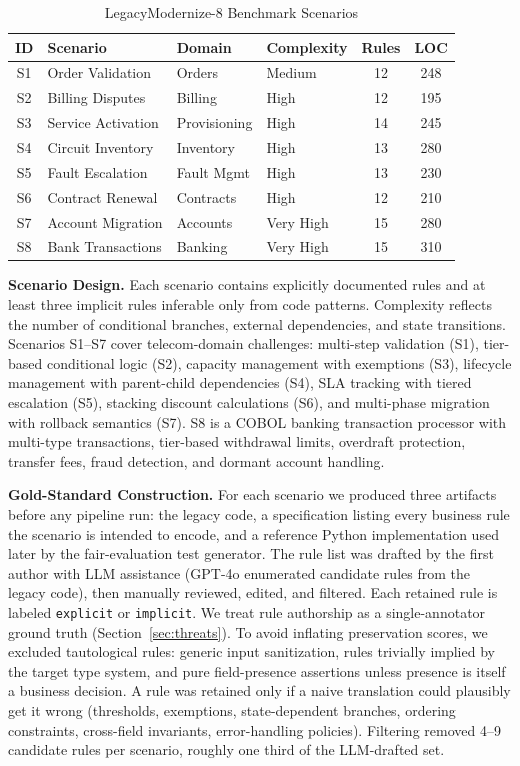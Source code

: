 \documentclass[conference]{IEEEtran}
\begin{document}
\begin{table}[htbp]
\caption{LegacyModernize-8 Benchmark Scenarios}
\label{tab:benchmark}
\centering
\footnotesize
\begin{tabular}{@{}clllcc@{}}
\toprule
\textbf{ID} & \textbf{Scenario} & \textbf{Domain} & \textbf{Complexity} & \textbf{Rules} & \textbf{LOC} \\
\midrule
S1 & Order Validation & Orders & Medium & 12 & 248 \\
S2 & Billing Disputes & Billing & High & 12 & 195 \\
S3 & Service Activation & Provisioning & High & 14 & 245 \\
S4 & Circuit Inventory & Inventory & High & 13 & 280 \\
S5 & Fault Escalation & Fault Mgmt & High & 13 & 230 \\
S6 & Contract Renewal & Contracts & High & 12 & 210 \\
S7 & Account Migration & Accounts & Very High & 15 & 280 \\
S8 & Bank Transactions & Banking & Very High & 15 & 310 \\
\bottomrule
\end{tabular}
\end{table}

\textbf{Scenario Design.} Each scenario contains explicitly documented rules and at least three implicit rules inferable only from code patterns. Complexity reflects the number of conditional branches, external dependencies, and state transitions. Scenarios S1--S7 cover telecom-domain challenges: multi-step validation (S1), tier-based conditional logic (S2), capacity management with exemptions (S3), lifecycle management with parent-child dependencies (S4), SLA tracking with tiered escalation (S5), stacking discount calculations (S6), and multi-phase migration with rollback semantics (S7). S8 is a COBOL banking transaction processor with multi-type transactions, tier-based withdrawal limits, overdraft protection, transfer fees, fraud detection, and dormant account handling.

\textbf{Gold-Standard Construction.} For each scenario we produced three artifacts before any pipeline run: the legacy code, a specification listing every business rule the scenario is intended to encode, and a reference Python implementation used later by the fair-evaluation test generator. The rule list was drafted by the first author with LLM assistance (GPT-4o enumerated candidate rules from the legacy code), then manually reviewed, edited, and filtered. Each retained rule is labeled \texttt{explicit} or \texttt{implicit}. We treat rule authorship as a single-annotator ground truth (Section~\ref{sec:threats}). To avoid inflating preservation scores, we excluded tautological rules: generic input sanitization, rules trivially implied by the target type system, and pure field-presence assertions unless presence is itself a business decision. A rule was retained only if a naive translation could plausibly get it wrong (thresholds, exemptions, state-dependent branches, ordering constraints, cross-field invariants, error-handling policies). Filtering removed 4--9 candidate rules per scenario, roughly one third of the LLM-drafted set.
\end{document}
